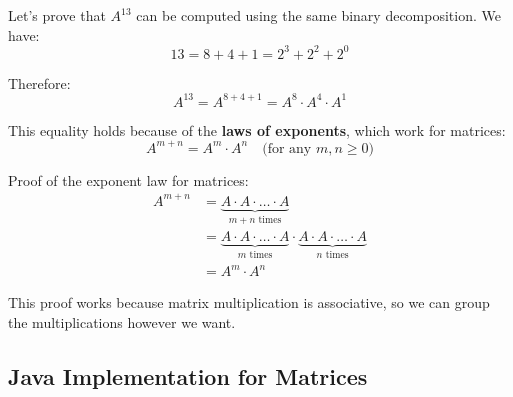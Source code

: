 \documentclass{article}
\begin{document}
	Let's prove that $A^{13}$ can be computed using the same binary decomposition. We have:
	\[
	13 = 8 + 4 + 1 = 2^3 + 2^2 + 2^0
	\]
	
	Therefore:
	\[
	A^{13} = A^{8+4+1} = A^8 \cdot A^4 \cdot A^1
	\]
	
	This equality holds because of the \textbf{laws of exponents}, which work for matrices:
	\[
	A^{m+n} = A^m \cdot A^n \quad \text{(for any } m, n \geq 0\text{)}
	\]
	
	Proof of the exponent law for matrices:
	\begin{align*}
		A^{m+n} &= \underbrace{A \cdot A \cdot \ldots \cdot A}_{m+n \text{ times}} \\
		&= \underbrace{A \cdot A \cdot \ldots \cdot A}_{m \text{ times}} \cdot \underbrace{A \cdot A \cdot \ldots \cdot A}_{n \text{ times}} \\
		&= A^m \cdot A^n
	\end{align*}
	
	This proof works because matrix multiplication is associative, so we can group the multiplications however we want.
		
	\subsection{Java Implementation for Matrices}
	
\end{document}
